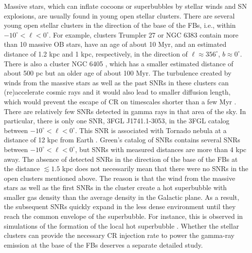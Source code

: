 Massive stars, which can inflate cocoons or superbubbles by stellar winds and SN explosions, are usually found in young open stellar clusters.
There are several young open stellar clusters in the direction of the base of the FBs, i.e., within $-10^\circ < \ell  < 0^\circ$.
For example, clusters Trumpler 27 \citep{1977ApJ...215..106M} or NGC 6383 \citep{1978MNRAS.184..661L}
contain more than 10 massive OB stars, have an age of about 10 Myr, and an estimated distance of 1.2 kpc and 1 kpc, respectively,
in the direction of $\ell \approx 356^\circ$, $b \approx 0^\circ$.
There is also a cluster NGC 6405 \citep{1959ZA.....47...15R}, which has a smaller estimated distance of about 500 pc
but an older age of about 100 Myr.
The turbulence created by winds from the massive stars as well as the past SNRs in these clusters can (re)accelerate cosmic rays and
it would also lead to smaller diffusion length, which would prevent the escape of CR on timescales shorter than a few Myr \citep{2011Sci...334.1103A}.
There are relatively few SNRs detected in gamma rays in that area of the sky.
In particular, there is only one SNR, 3FGL J1741.1-3053, in the 3FGL catalog \citep{2015ApJS..218...23A}
between $-10^\circ < \ell  < 0^\circ$.
This SNR is associated with Tornado nebula at a distance of 12 kpc from Earth \citep{2013ApJ...774...36C}.
Green's catalog of SNRs \citep{2014BASI...42...47G, 2017Green} contains several SNRs between $-10^\circ < \ell  < 0^\circ$,
but SNRs with measured distances are more than 4 kpc away.
The absence of detected SNRs in the direction of the base of the FBs at the distance $\lesssim 1.5$ kpc 
does not necessarily mean that there were no SNRs in the open clusters mentioned above.
The reason is that the wind from the massive stars as well as the first SNRs in the cluster create a hot superbubble
with smaller gas density than the average density in the Galactic plane. As a result, the subsequent SNRs quickly expand
in the less dense environment until they reach the common envelope of the superbubble.
For instance, this is observed in simulations of the formation of the local hot superbubble
\citep[e.g.,][]{2016Natur.532...73B, 2017A&A...604A..81S, 2018Galax...6...26S}.
Whether the stellar clusters can provide the necessary CR injection rate to power the gamma-ray emission at the base
of the FBs deserves a separate detailed study.

